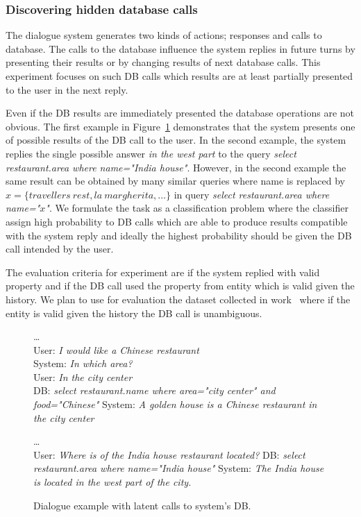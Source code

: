 \documentclass[11pt]{article}
\def\sys#1{{\color{purple}System: \it #1}}
\def\usr#1{{\color{brown}User: \it #1}}
\def\api#1{{\color{green}DB: \it #1}}
\begin{document}
\subsubsection*{Discovering hidden database calls}
The dialogue system generates two kinds of actions; responses and calls to database.
The calls to the database influence the system replies in future turns by presenting their results or by changing results of next database calls.
This experiment focuses on such DB calls which results are at least partially presented to the user in the next reply.

Even if the DB results are immediately presented the database operations are not obvious.  
The first example in Figure~\ref{fig:apicall} demonstrates that the system presents one of possible results of the DB call to the user.
In the second example, the system replies the single possible answer {\it in the west part} to the query {\it select restaurant.area where name="India house"}.
However, in the second example the same result can be obtained by many similar queries where name is replaced by $x=\{travellers\ rest, la\ margherita, \ldots\}$ in query {\it select restaurant.area where name="$x$"}.
We formulate the task as a classification problem where the classifier assign high probability to DB calls which are able to produce results compatible with the system reply and ideally the highest probability should be given the DB call intended by the user.

The evaluation criteria for experiment are if the system replied with valid property and if the DB call used the property from entity which is valid given the history.
We plan to use for evaluation the dataset collected in work~\cite{platek2016wochat} where if the entity is valid given the history the DB call is unambiguous. 

\begin{figure}
    \dots \\
    \usr{I would like a Chinese restaurant} \\
    \sys{In which area?} \\
    \usr{In the city center} \\
    \api{select restaurant.name where area="city center" and food="Chinese"}
    \sys{A golden house is a Chinese restaurant in the city center} 

    \dots \\
    \usr{Where is of the India house restaurant located?}
    \api{select restaurant.area where name="India house"}
    \sys{The India house is located in the west part of the city.}
    \caption{Dialogue example with latent calls to system's DB.}
    \label{fig:apicall}
\end{figure}
\end{document}
